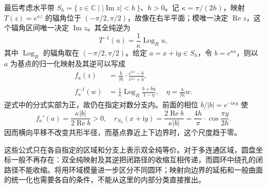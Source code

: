 最后考虑水平带 \(S_h=\{\,z\in\mathbb C\mid |\operatorname{Im}z|<h\,\}\)、\(h>0\)。记 \(\kappa=\pi/(2h)\)，映射 \(T(z)=e^{\kappa z}\) 的辐角位于 \((-\pi/2,\pi/2)\)，故像在右半平面；模唯一决定 \(\operatorname{Re}z\)，这个辐角区间唯一决定 \(\operatorname{Im}z\)。其全纯逆为
\[
 T^{-1}(u)=\frac1\kappa\operatorname{Log}_R u,
\]
其中 \(\operatorname{Log}_R\) 的辐角取在 \((-\pi/2,\pi/2)\)。给定 \(a=x+\mathrm{i}y\in S_h\)，令 \(b=e^{\kappa a}\)，则以 \(a\) 为基点的归一化映射及其逆可以写成
\[
 \begin{aligned}
 f_a(z)&=\frac{\overline b}{|b|}\cdot
        \frac{e^{\kappa z}-b}{e^{\kappa z}+\overline b},\\
 f_a^{-1}(w)&=\frac1\kappa\operatorname{Log}_R
                 \frac{b+\overline b\eta}{1-\eta},
 \quad \eta=\frac b{|b|}w.
 \end{aligned}
\]
逆式中的分式实部为正，故仍在指定对数分支内。前面的相位 \(\overline b/|b|=e^{-\mathrm{i}\kappa y}\) 使
\[
 f_a'(a)=\frac{\kappa|b|}{2\operatorname{Re}b}>0,
 \quad r_{S_h}(x+\mathrm{i}y)
 =\frac{2\operatorname{Re}b}{\kappa|b|}
 =\frac{4h}{\pi}\cdot\cos\frac{\pi y}{2h}.
\]
因而横向平移不改变共形半径，而基点靠近上下边界时，这个尺度趋于零。

\ProseParagraphBreak

这些公式只在各自指定的区域和分支上表示双全纯等价。对于多连通区域，圆盘坐标一般不再存在：双全纯映射及其逆把闭路径的收缩互相传递，而圆环中绕孔的闭路径不能收缩。将用环域模量进一步区分不同圆环；映射向边界的延拓和一般曲面的统一化也需要各自的条件，不能从这里的内部分类直接推出。
